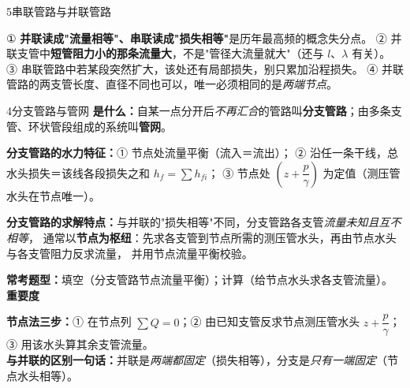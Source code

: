 \begin{kaodian}{5}{串联管路与并联管路}
\begin{yicuo}
① \textbf{并联读成"流量相等"、串联读成"损失相等"}是历年最高频的概念失分点。
② 并联支管中\textbf{短管阻力小的那条流量大}，不是"管径大流量就大"（还与 $l$、$\lambda$ 有关）。
③ 串联管路中若某段突然扩大，该处还有局部损失，别只累加沿程损失。
④ 并联管路的两支管长度、直径不同也可以，唯一必须相同的是\emph{两端节点}。
\end{yicuo}
\end{kaodian}

\begin{kaodian}{4}{分支管路与管网}
\textbf{是什么：}自某一点分开后\emph{不再汇合}的管路叫\textbf{分支管路}；由多条支管、环状管段组成的系统叫\textbf{管网}。

\textbf{分支管路的水力特征：}① 节点处流量平衡（流入＝流出）；
② 沿任一条干线，总水头损失＝该线各段损失之和 $h_f=\sum h_{fi}$；
③ 节点处 $\left(z+\dfrac{p}{\gamma}\right)$ 为定值（测压管水头在节点唯一）。

\textbf{分支管路的求解特点：}与并联的"损失相等"不同，分支管路各支管\emph{流量未知且互不相等}，
通常以\textbf{节点为枢纽}：先求各支管到节点所需的测压管水头，再由节点水头与各支管阻力反求流量，
并用节点流量平衡校验。

\textbf{常考题型：}填空（分支管路节点流量平衡）；计算（给节点水头求各支管流量）。
\textbf{重要度 }\quad{}\quad{}

\begin{banfa}
\textbf{节点法三步：}① 在节点列 $\sum Q=0$；② 由已知支管反求节点测压管水头
$z+\dfrac{p}{\gamma}$；③ 用该水头算其余支管流量。\\
\textbf{与并联的区别一句话：}并联是\emph{两端都固定}（损失相等），分支是\emph{只有一端固定}（节点水头相等）。
\end{banfa}
\end{kaodian}


